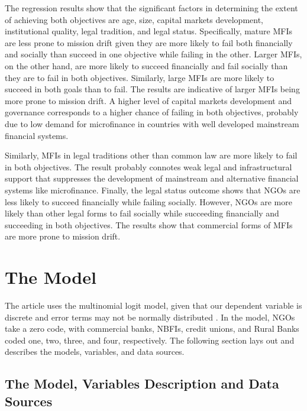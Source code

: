 \documentclass[a4paper, nobind]{templates/ociamthesis}
\begin{document}
The regression results show that the significant factors in determining the extent of achieving both objectives are age, size, capital markets development, institutional quality, legal tradition, and legal status. Specifically, mature MFIs are less prone to mission drift given they are more likely to fail both financially and socially than succeed in one objective while failing in the other. Larger MFIs, on the other hand, are more likely to succeed financially and fail socially than they are to fail in both objectives. Similarly, large MFIs are more likely to succeed in both goals than to fail. The results are indicative of larger MFIs being more prone to mission drift. A higher level of capital markets development and governance corresponds to a higher chance of failing in both objectives, probably due to low demand for microfinance in countries with well developed mainstream financial systems.

Similarly, MFIs in legal traditions other than common law are more likely to fail in both objectives. The result probably connotes weak legal and infrastructural support that suppresses the development of mainstream and alternative financial systems like microfinance. Finally, the legal status outcome shows that NGOs are less likely to succeed financially while failing socially. However, NGOs are more likely than other legal forms to fail socially while succeeding financially and succeeding in both objectives. The results show that commercial forms of MFIs are more prone to mission drift.

\hypertarget{the-model}{%
\section{The Model}\label{the-model}}

The article uses the multinomial logit model, given that our dependent variable is discrete and error terms may not be normally distributed \autocite{cramer2002origins}. In the model, NGOs take a zero code, with commercial banks, NBFIs, credit unions, and Rural Banks coded one, two, three, and four, respectively. The following section lays out and describes the models, variables, and data sources.

\hypertarget{the-model-variables-description-and-data-sources-1}{%
\subsection{The Model, Variables Description and Data Sources}\label{the-model-variables-description-and-data-sources-1}}
\end{document}
